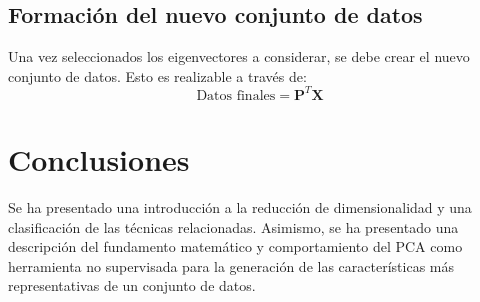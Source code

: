 \documentclass{article}
\begin{document}
\subsection{Formación del nuevo conjunto de datos}
\label{sub:formacion_del_nuevo_conjunto_de_datos}
Una vez seleccionados los eigenvectores a considerar, se debe crear el nuevo conjunto de datos.
Esto es realizable a través de:
$$
\text{Datos finales} = \textbf{P}^T \textbf{X}
$$ 


\section{Conclusiones}
\label{sec:conclusiones}
Se ha presentado una introducción a la reducción de dimensionalidad y una clasificación de las técnicas relacionadas.
Asimismo, se ha presentado una descripción del fundamento matemático y comportamiento del PCA como herramienta no supervisada para la generación de las características más representativas de un conjunto de datos.
\end{document}
